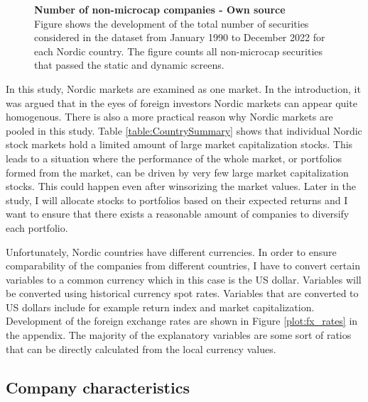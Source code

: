 \documentclass[12pt]{article}
\begin{document}
\begin{figure}[ht]
\centering
\caption[Number of non-micro-cap companies]{\textbf{Number of non-microcap companies \textnormal{- Own source}}\\ Figure shows the development of the total number of securities considered in the dataset from January 1990 to December 2022 for each Nordic country. The figure counts all non-microcap securities that passed the static and dynamic screens.}

\label{plot:number_of_companies_wo_micro}
\end{figure}

In this study, Nordic markets are examined as one market. In the introduction, it was argued that in the eyes of foreign investors Nordic markets can appear quite homogenous. There is also a more practical reason why Nordic markets are pooled in this study. Table \ref{table:CountrySummary} shows that individual Nordic stock markets hold a limited amount of large market capitalization stocks. This leads to a situation where the performance of the whole market, or portfolios formed from the market, can be driven by very few large market capitalization stocks. This could happen even after winsorizing the market values. Later in the study, I will allocate stocks to portfolios based on their expected returns and I want to ensure that there exists a reasonable amount of companies to diversify each portfolio. \par

Unfortunately, Nordic countries have different currencies. In order to ensure comparability of the companies from different countries, I have to convert certain variables to a common currency which in this case is the US dollar. Variables will be converted using historical currency spot rates. Variables that are converted to US dollars include for example return index and market capitalization. Development of the foreign exchange rates are shown in Figure \ref{plot:fx_rates} in the appendix. The majority of the explanatory variables are some sort of ratios that can be directly calculated from the local currency values. \par

\subsection{Company characteristics}\label{CompanyCharacteristics}
\end{document}
